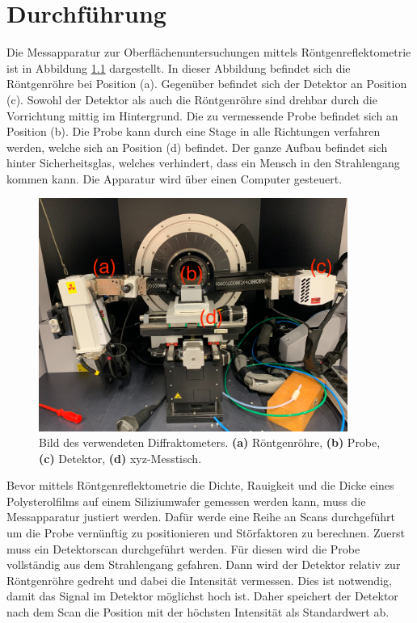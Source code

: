 \chapter{Durchführung}
\label{cha:Durchführung}

Die Messapparatur zur Oberflächenuntersuchungen mittels Röntgenreflektometrie ist in Abbildung \ref{fig:Aufbau} dargestellt. In dieser Abbildung befindet sich die Röntgenröhre bei 
Position (a). Gegenüber befindet sich der Detektor an Position (c). Sowohl der Detektor als auch die Röntgenröhre sind drehbar durch die Vorrichtung mittig im Hintergrund. 
Die zu vermessende Probe befindet sich an Position (b). Die Probe kann durch eine Stage in alle Richtungen verfahren werden, welche sich an Position (d) befindet. Der ganze Aufbau 
befindet sich hinter Sicherheitsglas, welches verhindert, dass ein Mensch in den Strahlengang kommen kann. Die Apparatur wird über einen Computer gesteuert.  

\begin{figure}
    \centering
    \includegraphics[width=0.9\textwidth]{content/Bilder/Aufbau.PNG}
    \caption{Bild des verwendeten Diffraktometers. \textbf{(a)} Röntgenröhre, \textbf{(b)} Probe, \textbf{(c)} Detektor, \textbf{(d)} xyz-Messtisch.}
    \label{fig:Aufbau}
\end{figure}

Bevor mittels Röntgenreflektometrie die Dichte, Rauigkeit und die Dicke eines Polysterolfilms auf einem Siliziumwafer gemessen werden kann, muss die Messapparatur justiert werden. 
Dafür werde eine Reihe an Scans durchgeführt um die Probe vernünftig zu positionieren und Störfaktoren zu berechnen. Zuerst muss ein Detektorscan durchgeführt werden. Für diesen 
wird die Probe vollständig aus dem Strahlengang gefahren. Dann wird der Detektor relativ zur Röntgenröhre gedreht und dabei die Intensität vermessen. Dies ist notwendig, damit das 
Signal im Detektor möglichst hoch ist. Daher speichert der Detektor nach dem Scan die Position mit der höchsten Intensität als Standardwert ab. 

